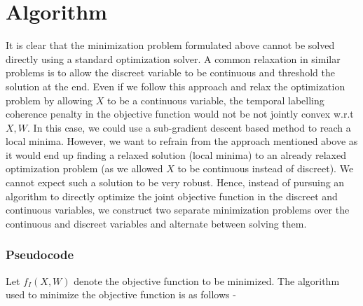 
\section{Algorithm}

It is clear that the minimization problem formulated above cannot
be solved directly using a standard optimization solver. A common
relaxation in similar problems is to allow the discreet variable to
be continuous and threshold the solution at the end. Even if we follow
this approach and relax the optimization problem by allowing $X$
to be a continuous variable, the temporal labelling coherence penalty
in the objective function would not be not jointly convex w.r.t $X,W$.
In this case, we could use a sub-gradient descent based method to
reach a local minima. However, we want to refrain from the approach
mentioned above as it would end up finding a relaxed solution (local
minima) to an already relaxed optimization problem (as we allowed
$X$ to be continuous instead of discreet). We cannot expect such
a solution to be very robust. Hence, instead of pursuing an algorithm
to directly optimize the joint objective function in the discreet
and continuous variables, we construct two separate minimization problems
over the continuous and discreet variables and alternate between solving
them.


\subsubsection*{Pseudocode}

Let $f_{I}(X,W)$ denote the objective function to be minimized. The
algorithm used to minimize the objective function is as follows -

